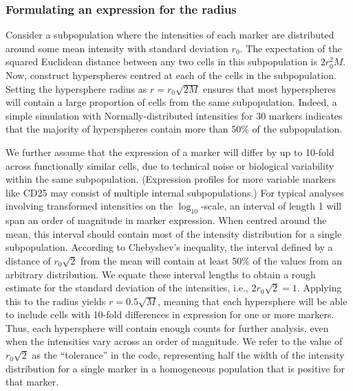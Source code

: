 \documentclass{article}
\begin{document}
\subsubsection{Formulating an expression for the radius}
Consider a subpopulation where the intensities of each marker are distributed around some mean intensity with standard deviation $r_0$.
The expectation of the squared Euclidean distance between any two cells in this subpopulation is $2r_0^2M$.
Now, construct hyperspheres centred at each of the cells in the subpopulation.
Setting the hypersphere radius as $r=r_0\sqrt{2M}$ ensures that most hyperspheres will contain a large proportion of cells from the same subpopulation.
Indeed, a simple simulation with Normally-distributed intensities for 30 markers indicates that the majority of hyperspheres contain more than 50\% of the subpopulation.


We further assume that the expression of a marker will differ by up to 10-fold across functionally similar cells, due to technical noise or biological variability within the same subpopulation.
(Expression profiles for more variable markers like CD25 may consist of multiple internal subpopulations.)
For typical analyses involving transformed intensities on the $\log_{10}$-scale, an interval of length 1 will span an order of magnitude in marker expression.
When centred around the mean, this interval should contain most of the intensity distribution for a single subpopulation.
According to Chebyshev's inequality, the interval defined by a distance of $r_0\sqrt{2}$ from the mean will contain at least 50\% of the values from an arbitrary distribution.
We equate these interval lengths to obtain a rough estimate for the standard deviation of the intensities, i.e., $2r_0\sqrt{2} = 1$.
Applying this to the radius yields $r=0.5\sqrt{M}$, meaning that each hypersphere will be able to include cells with 10-fold differences in expression for one or more markers.
Thus, each hypersphere will contain enough counts for further analysis, even when the intensities vary across an order of magnitude.
We refer to the value of $r_0\sqrt{2}$ as the ``tolerance'' in the code, representing half the width of the intensity distribution for a single marker in a homogeneous population that is positive for that marker.
\end{document}
